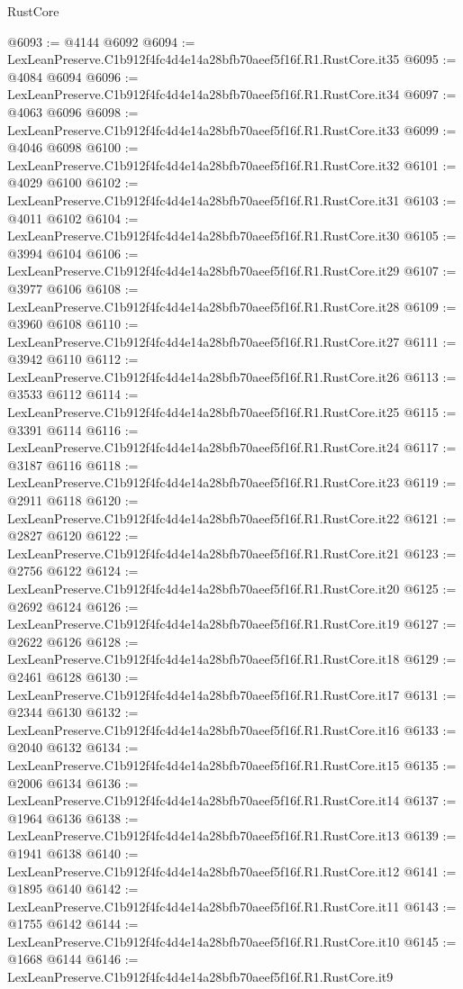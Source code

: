 \begin{lexlean}{RustCore}
\begin{coremodule}
@6093 := @4144 @6092
@6094 := LexLeanPreserve.C1b912f4fc4d4e14a28bfb70aeef5f16f.R1.RustCore.it35
@6095 := @4084 @6094
@6096 := LexLeanPreserve.C1b912f4fc4d4e14a28bfb70aeef5f16f.R1.RustCore.it34
@6097 := @4063 @6096
@6098 := LexLeanPreserve.C1b912f4fc4d4e14a28bfb70aeef5f16f.R1.RustCore.it33
@6099 := @4046 @6098
@6100 := LexLeanPreserve.C1b912f4fc4d4e14a28bfb70aeef5f16f.R1.RustCore.it32
@6101 := @4029 @6100
@6102 := LexLeanPreserve.C1b912f4fc4d4e14a28bfb70aeef5f16f.R1.RustCore.it31
@6103 := @4011 @6102
@6104 := LexLeanPreserve.C1b912f4fc4d4e14a28bfb70aeef5f16f.R1.RustCore.it30
@6105 := @3994 @6104
@6106 := LexLeanPreserve.C1b912f4fc4d4e14a28bfb70aeef5f16f.R1.RustCore.it29
@6107 := @3977 @6106
@6108 := LexLeanPreserve.C1b912f4fc4d4e14a28bfb70aeef5f16f.R1.RustCore.it28
@6109 := @3960 @6108
@6110 := LexLeanPreserve.C1b912f4fc4d4e14a28bfb70aeef5f16f.R1.RustCore.it27
@6111 := @3942 @6110
@6112 := LexLeanPreserve.C1b912f4fc4d4e14a28bfb70aeef5f16f.R1.RustCore.it26
@6113 := @3533 @6112
@6114 := LexLeanPreserve.C1b912f4fc4d4e14a28bfb70aeef5f16f.R1.RustCore.it25
@6115 := @3391 @6114
@6116 := LexLeanPreserve.C1b912f4fc4d4e14a28bfb70aeef5f16f.R1.RustCore.it24
@6117 := @3187 @6116
@6118 := LexLeanPreserve.C1b912f4fc4d4e14a28bfb70aeef5f16f.R1.RustCore.it23
@6119 := @2911 @6118
@6120 := LexLeanPreserve.C1b912f4fc4d4e14a28bfb70aeef5f16f.R1.RustCore.it22
@6121 := @2827 @6120
@6122 := LexLeanPreserve.C1b912f4fc4d4e14a28bfb70aeef5f16f.R1.RustCore.it21
@6123 := @2756 @6122
@6124 := LexLeanPreserve.C1b912f4fc4d4e14a28bfb70aeef5f16f.R1.RustCore.it20
@6125 := @2692 @6124
@6126 := LexLeanPreserve.C1b912f4fc4d4e14a28bfb70aeef5f16f.R1.RustCore.it19
@6127 := @2622 @6126
@6128 := LexLeanPreserve.C1b912f4fc4d4e14a28bfb70aeef5f16f.R1.RustCore.it18
@6129 := @2461 @6128
@6130 := LexLeanPreserve.C1b912f4fc4d4e14a28bfb70aeef5f16f.R1.RustCore.it17
@6131 := @2344 @6130
@6132 := LexLeanPreserve.C1b912f4fc4d4e14a28bfb70aeef5f16f.R1.RustCore.it16
@6133 := @2040 @6132
@6134 := LexLeanPreserve.C1b912f4fc4d4e14a28bfb70aeef5f16f.R1.RustCore.it15
@6135 := @2006 @6134
@6136 := LexLeanPreserve.C1b912f4fc4d4e14a28bfb70aeef5f16f.R1.RustCore.it14
@6137 := @1964 @6136
@6138 := LexLeanPreserve.C1b912f4fc4d4e14a28bfb70aeef5f16f.R1.RustCore.it13
@6139 := @1941 @6138
@6140 := LexLeanPreserve.C1b912f4fc4d4e14a28bfb70aeef5f16f.R1.RustCore.it12
@6141 := @1895 @6140
@6142 := LexLeanPreserve.C1b912f4fc4d4e14a28bfb70aeef5f16f.R1.RustCore.it11
@6143 := @1755 @6142
@6144 := LexLeanPreserve.C1b912f4fc4d4e14a28bfb70aeef5f16f.R1.RustCore.it10
@6145 := @1668 @6144
@6146 := LexLeanPreserve.C1b912f4fc4d4e14a28bfb70aeef5f16f.R1.RustCore.it9

\end{coremodule}
\end{lexlean}
